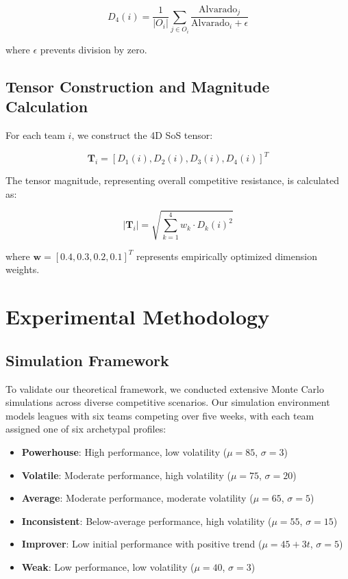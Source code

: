 \documentclass[11pt]{article}
\begin{document}
\begin{equation}
D_4(i) = \frac{1}{|O_i|} \sum_{j \in O_i} \frac{\text{Alvarado}_j}{\text{Alvarado}_i + \epsilon}
\end{equation}

where $\epsilon$ prevents division by zero.

\subsection{Tensor Construction and Magnitude Calculation}

For each team $i$, we construct the 4D SoS tensor:

\begin{equation}
\mathbf{T}_i = [D_1(i), D_2(i), D_3(i), D_4(i)]^T
\end{equation}

The tensor magnitude, representing overall competitive resistance, is calculated as:

\begin{equation}
|\mathbf{T}_i| = \sqrt{\sum_{k=1}^{4} w_k \cdot D_k(i)^2}
\end{equation}

where $\mathbf{w} = [0.4, 0.3, 0.2, 0.1]^T$ represents empirically optimized dimension weights.

\section{Experimental Methodology}

\subsection{Simulation Framework}

To validate our theoretical framework, we conducted extensive Monte Carlo simulations across diverse competitive scenarios. Our simulation environment models leagues with six teams competing over five weeks, with each team assigned one of six archetypal profiles:

\begin{itemize}
    \item \textbf{Powerhouse}: High performance, low volatility ($\mu = 85$, $\sigma = 3$)
    \item \textbf{Volatile}: Moderate performance, high volatility ($\mu = 75$, $\sigma = 20$)
    \item \textbf{Average}: Moderate performance, moderate volatility ($\mu = 65$, $\sigma = 5$)
    \item \textbf{Inconsistent}: Below-average performance, high volatility ($\mu = 55$, $\sigma = 15$)
    \item \textbf{Improver}: Low initial performance with positive trend ($\mu = 45 + 3t$, $\sigma = 5$)
    \item \textbf{Weak}: Low performance, low volatility ($\mu = 40$, $\sigma = 3$)
\end{itemize}
\end{document}
